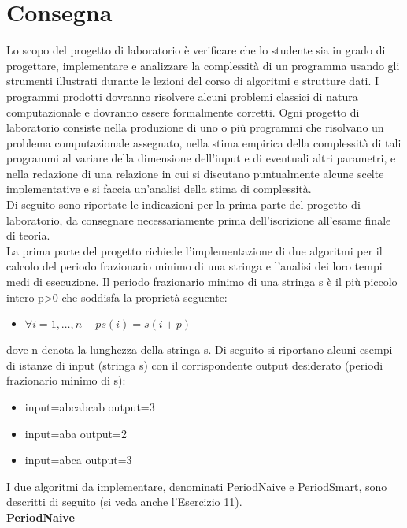 \chapter{Consegna}
Lo scopo del progetto di laboratorio è verificare che lo studente sia in grado di progettare, implementare e analizzare la complessità di un programma usando gli strumenti illustrati durante le lezioni del corso di algoritmi e strutture dati. I programmi prodotti dovranno risolvere alcuni problemi classici di natura computazionale e dovranno essere formalmente corretti. Ogni progetto di laboratorio consiste nella produzione di uno o più programmi che risolvano un problema computazionale assegnato, nella stima empirica della complessità di tali programmi al variare della dimensione dell'input e di eventuali altri parametri, e nella redazione di una relazione in cui si discutano puntualmente alcune scelte implementative e si faccia un'analisi della stima di complessità.
\vspace{3mm}
\\Di seguito sono riportate le indicazioni per la prima parte del progetto di laboratorio, da consegnare necessariamente prima dell'iscrizione all'esame finale di teoria.\\
La prima parte del progetto richiede l'implementazione di due algoritmi per il calcolo del periodo frazionario minimo di una stringa e l'analisi dei loro tempi medi di esecuzione. Il periodo frazionario minimo di una stringa s è il più piccolo intero p>0 che soddisfa la proprietà seguente:
\begin{itemize}
    \item $\forall i=1,\ldots,n-ps(i)=s(i+p)$
\end{itemize}
\vspace{3mm}
dove n denota la lunghezza della stringa s.
\vspace{3mm}
Di seguito si riportano alcuni esempi di istanze di input (stringa s) con il corrispondente output desiderato (periodi frazionario minimo di s):
\begin{itemize}
    \item input=abcabcab output=3
    \item input=aba output=2
    \item input=abca output=3
\end{itemize}
I due algoritmi da implementare, denominati PeriodNaive e PeriodSmart, sono descritti di seguito (si veda anche l'Esercizio 11).
\vspace{3mm}\\
\textbf{PeriodNaive}
